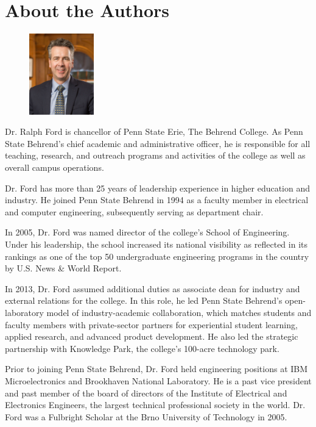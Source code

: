 \section{About the Authors}\label{about-the-authors}


\begin{figure}
\centering
\includegraphics[width=0.25\textwidth]{./Fig/Ford.jpg}
\end{figure}


Dr. Ralph Ford is chancellor of Penn State Erie, The Behrend College. As Penn State Behrend’s chief 
academic and administrative officer, he is responsible for all teaching, research, and outreach 
programs and activities of the college as well as overall campus operations.

Dr. Ford has more than 25 years of leadership experience in higher education and industry. He
 joined Penn State Behrend in 1994 as a faculty member in electrical and computer engineering, 
 subsequently serving as department chair.

In 2005, Dr. Ford was named director of the college’s School of Engineering. Under his leadership,
the school increased its national visibility as reflected in its rankings as one of the top 50 
undergraduate engineering programs in the country by U.S. News \& World Report.

In 2013, Dr. Ford assumed additional duties as associate dean for industry and external 
relations for the college. In this role, he led Penn State Behrend’s open-laboratory model
 of industry-academic collaboration, which matches students and faculty members with 
 private-sector partners for experiential student learning, applied research, and advanced
  product development. He also led the strategic partnership with Knowledge Park, the 
  college’s 100-acre technology park.

Prior to joining Penn State Behrend, Dr. Ford held engineering positions at IBM Microelectronics 
and Brookhaven National Laboratory. He is a past vice president and past member of the
 board of directors of the Institute of Electrical and Electronics Engineers, the largest technical 
 professional society in the world. Dr. Ford was a Fulbright Scholar at the Brno University of 
 Technology in 2005.


